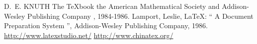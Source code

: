 \documentclass{mcmthesis}
\begin{document}

\begin{thebibliography}{99}
 D.~E. KNUTH   The \TeX{}book  the American
Mathematical Society and Addison-Wesley
Publishing Company , 1984-1986.
Lamport, Leslie,  \LaTeX{}: `` A Document Preparation System '',
Addison-Wesley Publishing Company, 1986.
\url{http://www.latexstudio.net/}
\url{http://www.chinatex.org/}
\end{thebibliography}

\end{document}
